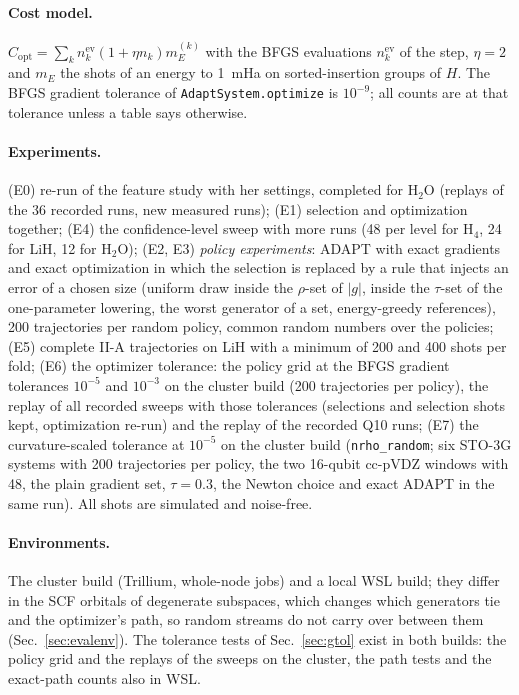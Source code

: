 \documentclass[11pt]{article}
\newcommand{\Copt}{C_{\mathrm{opt}}}
\begin{document}
\paragraph{Cost model.} $\Copt=\sum_k n^{\mathrm{ev}}_k(1+\eta n_k)m_E^{(k)}$ with the BFGS evaluations $n^{\mathrm{ev}}_k$ of the step, $\eta=2$ and $m_E$ the shots of an energy to 1~mHa on sorted-insertion groups of $H$. The BFGS gradient tolerance of \texttt{AdaptSystem.optimize} is $10^{-9}$;
all counts are at that tolerance unless a table says otherwise.

\paragraph{Experiments.} (E0) re-run of the feature study with her settings, completed for H$_2$O (replays of the 36 recorded runs, new measured runs); (E1) selection and optimization together; (E4) the confidence-level sweep with more runs
(48 per level for H$_4$, 24 for LiH, 12 for H$_2$O); (E2, E3) \emph{policy experiments}: ADAPT with exact gradients and exact optimization in which the selection is replaced by a rule that injects an error of a chosen size (uniform draw inside the $\rho$-set of $|g|$, inside the
$\tau$-set of the one-parameter lowering, the worst generator of a set, energy-greedy references), 200 trajectories per random policy, common random numbers over the policies; (E5) complete II-A trajectories on LiH with a minimum of 200 and 400 shots per fold; (E6) the optimizer tolerance: the policy grid at the BFGS gradient tolerances $10^{-5}$ and $10^{-3}$ on the cluster build (200 trajectories per policy), the replay of all recorded sweeps with those tolerances (selections and selection shots kept, optimization re-run) and the replay of the recorded Q10 runs; (E7) the curvature-scaled tolerance at $10^{-5}$ on the cluster build (\texttt{nrho\_random}; six STO-3G systems with 200 trajectories per policy, the two 16-qubit cc-pVDZ windows with 48, the plain gradient set, $\tau=0.3$, the Newton choice and exact ADAPT in the same run).
All shots are simulated and noise-free.

\paragraph{Environments.} The cluster build (Trillium, whole-node jobs) and a local WSL build; they differ in the SCF orbitals of degenerate subspaces, which changes which generators tie and the optimizer's path, so random streams do not carry over between them
(Sec.~\ref{sec:evalenv}). The tolerance tests of Sec.~\ref{sec:gtol} exist in both builds: the policy grid and the replays of the sweeps on the cluster, the path tests and the exact-path counts also in WSL.
\end{document}
